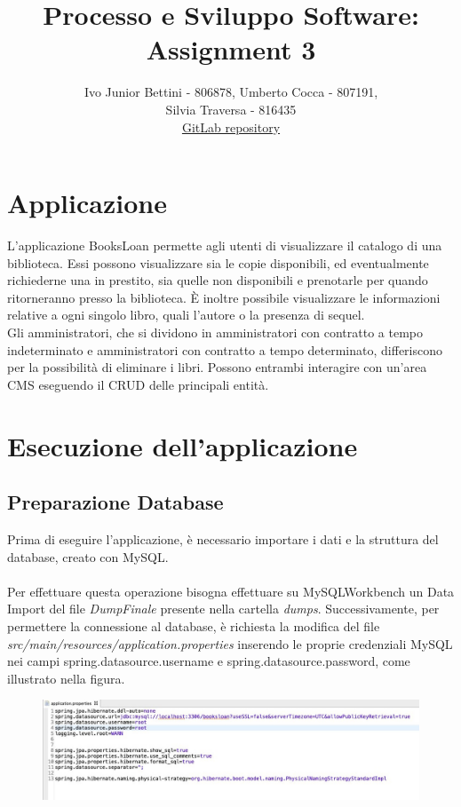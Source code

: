 \documentclass[a4paper,10pt]{article}
\title{Processo e Sviluppo Software: Assignment 3}
\author{Ivo Junior Bettini - 806878, Umberto Cocca - 807191, \\Silvia Traversa - 816435\\
\href{https://gitlab.com/s.traversa/2019_assignment3_booksloan}{GitLab repository}}
\date{}
\begin{document}
\maketitle 

\section*{Applicazione}
L'applicazione BooksLoan permette agli utenti di visualizzare il catalogo di una biblioteca. Essi possono visualizzare sia le copie disponibili, ed eventualmente richiederne una in prestito, sia quelle non disponibili e prenotarle per quando ritorneranno presso la biblioteca.
È inoltre possibile visualizzare le informazioni relative a ogni singolo libro, quali l'autore o la presenza di sequel.\\ 

\noindent Gli amministratori, che si dividono in amministratori con contratto a tempo indeterminato e amministratori con contratto a tempo determinato, differiscono per la possibilità di eliminare i libri. Possono entrambi interagire con un'area CMS eseguendo il CRUD delle principali entità. 

\section*{Esecuzione dell'applicazione}
\subsection*{Preparazione Database}
Prima di eseguire l'applicazione, è necessario importare i dati e la struttura del database, creato con MySQL.\\\\
Per effettuare questa operazione bisogna effettuare su MySQLWorkbench un Data Import del file \textit{DumpFinale} presente nella cartella \textit{dumps}. Successivamente, per permettere la connessione al database, è richiesta la modifica del file \textit{src/main/resources/application.properties} inserendo le proprie credenziali MySQL nei campi spring.datasource.username e spring.datasource.password, come illustrato nella figura.\\
\begin{figure}[H]
	\centering
	\includegraphics[width=1\linewidth]{images/properties}
\end{figure}
\newpage
\end{document}
